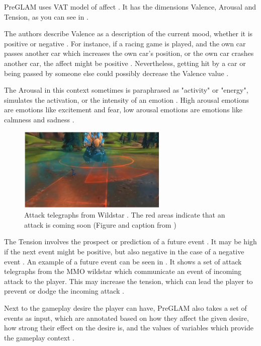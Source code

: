 PreGLAM uses VAT model of affect \cite{plut2023preglam}. It has the dimensions
Valence, Arousal and Tension, as you can see in . 

The authors describe Valence as a description of the current mood, whether it
is positive or negative \cite{plut2023preglam}. For instance, if a racing
game is played, and the own car passes another car which increases
the own car's position, or the own car crashes another car, the affect might be 
positive \cite{plut2023preglam}.
Nevertheless, getting hit by a car or being passed by someone else could 
possibly decrease the Valence value \cite{plut2023preglam}.

The Arousal in this context sometimes is paraphrased as "activity" or "energy", 
simulates the activation, or the intensity of an emotion \cite{plut2023preglam}.
High arousal emotions are emotions like excitement and fear, low arousal emotions
are emotions like calmness and sadness \cite{plut2023preglam}. 

\begin{figure}[h]
    \centering
    \includegraphics[width=\linewidth,height=4cm]{images/wildstar_attack_indicator.png}
    \caption{Attack telegraphs from Wildstar \cite{nixius2014wildstartelegraph}. The red areas indicate that an attack is coming soon (Figure and caption from \cite{plut2023preglam})}
    \label{fig:wildstar_indicator}
\end{figure}

The Tension involves the prospect or prediction of a future event
\cite{plut2023preglam}. It may be high if the next event might
be positive, but also negative in the case of a negative event
\cite{plut2023preglam}. An example of a future event can be seen
in . It shows a set of attack telegraphs
from the MMO wildstar \cite{nixius2014wildstartelegraph} which 
communicate an event of incoming attack to the 
player\cite{plut2023preglam}. This may increase the tension, which
can lead the player to prevent or dodge the incoming attack 
\cite{plut2023preglam}.

Next to the gameplay desire the player can have, PreGLAM
also takes a set of events as input, which are annotated based
on how they affect the given desire, how strong their effect
on the desire is, and the values of variables which provide the 
gameplay context \cite{plut2023preglam}.

